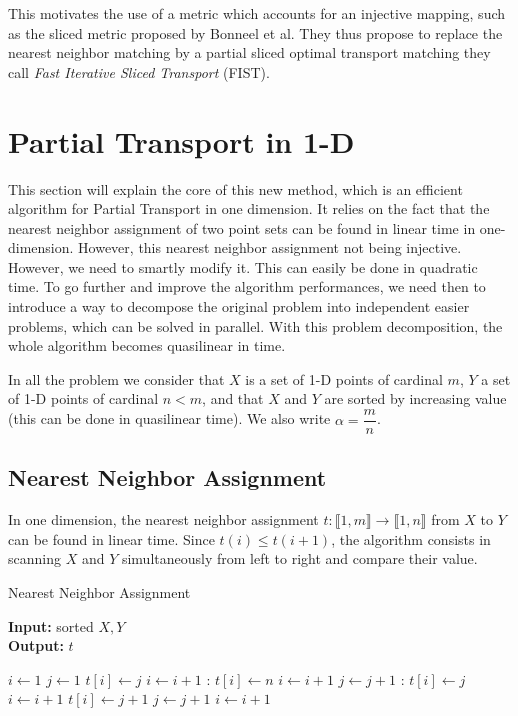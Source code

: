 \documentclass[a4paper,12pt]{article}
\begin{document}
This motivates the use of a metric which accounts for an injective mapping, such as the sliced metric proposed by Bonneel et al. They thus propose to replace the nearest neighbor matching by a partial sliced optimal transport matching they call \textit{Fast Iterative Sliced Transport} (FIST). 


\newpage

\section{Partial Transport in 1-D}

This section will explain the core of this new method, which is an efficient algorithm for Partial Transport in one dimension. It relies on the fact that the nearest neighbor assignment of two point sets can be found in linear time in one-dimension. However, this nearest neighbor assignment not being injective. However, we need to smartly modify it. This can easily be done in quadratic time. To go further and improve the algorithm performances, we need then to introduce a way to decompose the original problem into independent easier problems, which can be solved in parallel. With this problem decomposition, the whole algorithm becomes quasilinear in time.

In all the problem we consider that $X$ is a set of 1-D points of cardinal $m$, $Y$ a set of 1-D points of cardinal $n<m$, and that $X$ and $Y$ are sorted by increasing value (this can be done in quasilinear time). We also write $\alpha = \dfrac{m}{n}$.

\subsection{Nearest Neighbor Assignment}

In one dimension, the nearest neighbor assignment $t : \llbracket 1,m \rrbracket \rightarrow \llbracket 1,n \rrbracket$ from $X$ to $Y$ can be found in linear time. Since $t(i) \leqslant t(i+1)$, the algorithm consists in scanning $X$ and $Y$ simultaneously from left to right and compare their value. \\

\begin{algorithm}
\caption{Nearest Neighbor Assignment}\label{t}
\hspace*{\algorithmicindent} \textbf{Input:} sorted $X,Y$\\
\hspace*{\algorithmicindent} \textbf{Output:} $t$ 
\begin{algorithmic}[1]
\State $i\gets 1$
\State $j\gets 1$
		\State $t[i] \gets j$
		\State $i \gets i+1$
    :
        \State $t[i] \gets n$
        \State $i \gets i+1$
        \State $j \gets j+1$
    :
        \State $t[i] \gets j$
        \State $i \gets i+1$
    \Else
        \State $t[i] \gets j+1$
        \State $j \gets j+1$
        \State $i \gets i+1$
    \EndIf
\EndWhile
\State {}
\end{algorithmic}
\end{algorithm}
\end{document}
